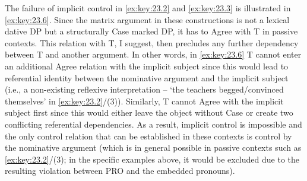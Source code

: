 \documentclass[output=paper]{langsci/langscibook}
\begin{document}
\ea%
    \label{ex:key:23.5}
\z
%
The failure of implicit control in \eqref{ex:key:23.2} and \eqref{ex:key:23.3}
is illustrated in \eqref{ex:key:23.6}. Since the matrix argument in these
constructions is not a lexical dative DP but a structurally Case marked DP, it
has to Agree with T in passive contexts. This relation with T, I suggest, then
precludes any further dependency between T and another argument. In other
words, in \eqref{ex:key:23.6} T cannot enter an additional Agree relation with
the implicit subject since this would lead to referential identity between the
nominative argument and the implicit subject (i.e., a
non-existing reflexive interpretation – ‘the teachers begged/convinced
themselves’ in \eqref{ex:key:23.2}/(3)). Similarly, T cannot Agree with the
implicit subject first since this would either leave the object without Case or
create two conflicting referential dependencies. As a result, implicit control
is impossible and the only control relation that can be established in these
contexts is control by the nominative argument (which is in
general possible in passive contexts such as \eqref{ex:key:23.2}/(3); in the
specific examples above, it would be excluded due to the resulting 
violation between PRO and the embedded pronouns).
\end{document}
